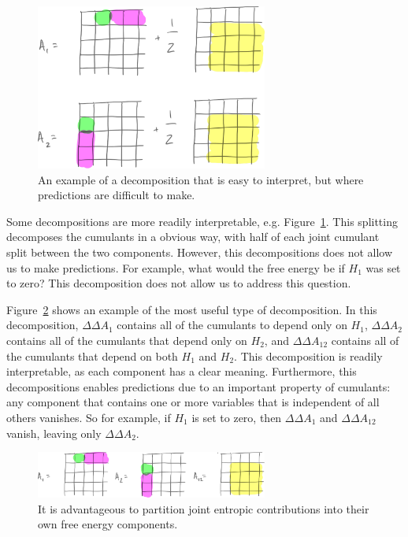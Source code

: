 \documentclass{article}
\begin{document}
\begin{figure}[tb]
\centering
\includegraphics[width=3in]{figure4.pdf}
\caption{An example of a decomposition that is easy to interpret, but where predictions are difficult to make.}
\label{fig:ok_split}
\end{figure}

Some decompositions are more readily interpretable, e.g. Figure~\ref{fig:ok_split}. This splitting decomposes the cumulants in a obvious way, with half of each joint cumulant split between the two components. However, this decompositions does not allow us to make predictions. For example, what would the free energy be if $H_1$ was set to zero? This decomposition does not allow us to address this question.


Figure~\ref{fig:good_split} shows an example of the most useful type of decomposition. In this decomposition, $\Delta\Delta A_1$ contains all of the cumulants to depend only on $H_1$, $\Delta\Delta A_2$ contains all of the cumulants that depend only on $H_2$, and $\Delta\Delta A_{12}$ contains all of the cumulants that depend on both $H_1$ and $H_2$. This decomposition is readily interpretable, as each component has a clear meaning. Furthermore, this decompositions enables predictions due to an important property of cumulants: any component that contains one or more variables that is independent of all others vanishes. So for example, if $H_1$ is set to zero, then $\Delta\Delta A_1$ and $\Delta\Delta A_{12}$ vanish, leaving only $\Delta\Delta A_2$.

\begin{figure}[tb]
\centering
\includegraphics[width=3in]{figure5.pdf}
\caption{It is advantageous to partition joint entropic contributions into their own free energy components.}
\label{fig:good_split}
\end{figure}
\end{document}
